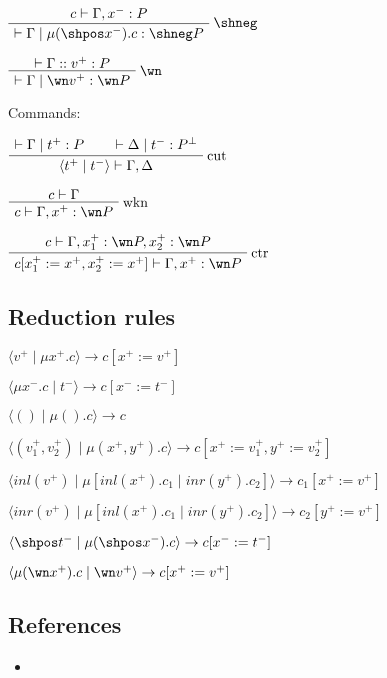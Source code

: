 \(\AxRule{c\vdash \Gamma, x^-: P}
\LabelRule{\shneg}
\UnaRule{\vdash\Gamma \mid \mu(\shpos x^-).c : \shneg P}
\DisplayProof\)

\(\AxRule{\vdash \Gamma :: v^+ : P}
\LabelRule{\wn}
\UnaRule{\vdash\Gamma \mid \wn v^+ : \wn P}
\DisplayProof\)

Commands:

\(\AxRule{\vdash \Gamma \mid t^+ : P}
\AxRule{\vdash \Delta \mid t^- : P\orth}
\LabelRule{\rulename{cut}}
\BinRule{\langle t^+ \mid t^-\rangle\vdash\Gamma, \Delta}
\DisplayProof\)

\(\AxRule{c \vdash \Gamma}
\LabelRule{\rulename{wkn}}
\UnaRule{c \vdash\Gamma, x^+: \wn P}
\DisplayProof\)

\(\AxRule{c \vdash \Gamma, x_1^+:\wn P, x_2^+:\wn P}
\LabelRule{\rulename{ctr}}
\UnaRule{c[x_1^+ := x^+, x_2^+ := x^+] \vdash\Gamma, x^+: \wn P}
\DisplayProof\)

\subsection{Reduction rules}\label{reduction-rules}

\(\langle v^+ \mid \mu x^+.c \rangle \rightarrow c[ x^+ := v^+]\)

\(\langle \mu x^-.c \mid t^- \rangle \rightarrow c[x^- := t^-]\)

\(\langle () \mid \mu().c \rangle \rightarrow c\)

\(\langle (v_1^+, v_2^+) \mid \mu(x^+, y^+).c \rangle \rightarrow c[x^+ := v_1^+, y^+ := v_2^+]\)

\(\langle inl(v^+) \mid \mu[inl(x^+).c_1 \mid inr(y^+).c_2] \rangle \rightarrow c_1[x^+ := v^+]\)

\(\langle inr(v^+) \mid \mu[inl(x^+).c_1 \mid inr(y^+).c_2] \rangle \rightarrow c_2[y^+ := v^+]\)

\(\langle \shpos t^- \mid \mu(\shpos x^-).c \rangle \rightarrow c[x^- := t^-]\)

\(\langle \mu(\wn x^+).c \mid \wn v^+ \rangle \rightarrow c[x^+ := v^+]\)

\subsection{References}\label{references}

\begin{itemize}
\item
\end{itemize}

